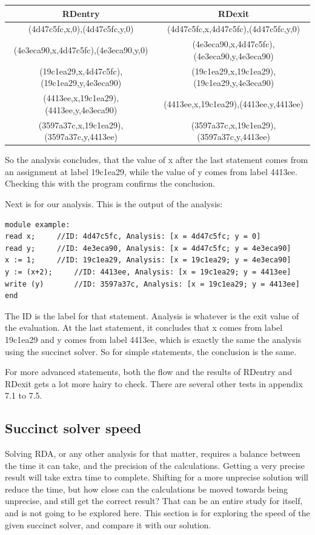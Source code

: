 \begin{center}
	\begin{tabular}{ | c | c | }
		\hline
		RDentry & RDexit \\
		\hline
		\hline
		(4d47c5fc,x,0),(4d47c5fc,y,0) & (4d47c5fc,x,4d47c5fc),(4d47c5fc,y,0) \\
		(4e3eca90,x,4d47c5fc),(4e3eca90,y,0) & (4e3eca90,x,4d47c5fc),(4e3eca90,y,4e3eca90) \\
		(19c1ea29,x,4d47c5fc),(19c1ea29,y,4e3eca90) & (19c1ea29,x,19c1ea29),(19c1ea29,y,4e3eca90) \\
		(4413ee,x,19c1ea29),(4413ee,y,4e3eca90) & (4413ee,x,19c1ea29),(4413ee,y,4413ee) \\
		(3597a37c,x,19c1ea29),(3597a37c,y,4413ee) & (3597a37c,x,19c1ea29),(3597a37c,y,4413ee) \\
		\hline
	\end{tabular}
\end{center}

So the analysis concludes, that the value of x after the last statement comes from an assignment at label 19c1ea29, while the value of y comes from label 4413ee. Checking this with the program confirms the conclusion.

Next is for our analysis. This is the output of the analysis:

\begin{lstlisting}
module example:
read x;		//ID: 4d47c5fc, Analysis: [x = 4d47c5fc; y = 0]
read y;		//ID: 4e3eca90, Analysis: [x = 4d47c5fc; y = 4e3eca90]
x := 1;		//ID: 19c1ea29, Analysis: [x = 19c1ea29; y = 4e3eca90]
y := (x+2);		//ID: 4413ee, Analysis: [x = 19c1ea29; y = 4413ee]
write (y)		//ID: 3597a37c, Analysis: [x = 19c1ea29; y = 4413ee]
end
\end{lstlisting}

The ID is the label for that statement. Analysis is whatever is the exit value of the evaluation. At the last statement, it concludes that x comes from label 19c1ea29 and y comes from label 4413ee, which is exactly the same the analysis using the succinct solver. So for simple statements, the conclusion is the same.

For more advanced statements, both the flow and the results of RDentry and RDexit gets a lot more hairy to check. There are several other tests in appendix 7.1 to 7.5.

\subsection{Succinct solver speed}
Solving RDA, or any other analysis for that matter, requires a balance between the time it can take, and the precision of the calculations. Getting a very precise result will take extra time to complete. Shifting for a more unprecise solution will reduce the time, but how close can the calculations be moved towards being unprecise, and still get the correct result? That can be an entire study for itself, and is not going to be explored here. This section is for exploring the speed of the given succinct solver, and compare it with our solution.

